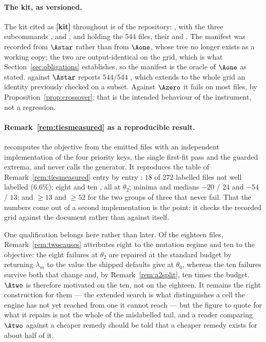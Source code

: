 \paragraph{The kit, as versioned.} The kit cited as \textbf{[kit]} throughout is
 of the repository: ,  with the
three subcommands ,  and , and  holding
the $544$ files, their  and . The manifest
was recorded from $\Astar$ rather than from $\Aone$, whose tree no longer exists as a working
copy; the two are output-identical on the grid, which is what
Section~\ref{sec:obligations} establishes, so the manifest is the oracle of $\Aone$ as stated.
 against $\Astar$ reports $544/544$ , which extends to the
whole grid an identity previously checked on a subset. Against $\Azero$ it fails on most
files, by Proposition~\ref{prop:crossover}; that is the intended behaviour of the instrument,
not a regression.

\paragraph{Remark~\ref{rem:tiesmeasured} as a reproducible result.} 
recomputes the objective from the emitted files with an independent implementation of the four
priority keys, the single first-fit pass and the guarded extrema, and never calls the
generator. It reproduces the table of Remark~\ref{rem:tiesmeasured} entry by entry :
$18$ of $272$ labelled files not well labelled ($6.6\%$); eight  and ten
, all at $\theta_2$; minima and medians $-20$ / $24$ and
$-54$ / $13$; and $\ge13$ and $\ge52$ for the two groups of three that never fail. That the
numbers come out of a second implementation is the point: it checks the recorded grid against
the document rather than against itself.

One qualification belongs here rather than later. Of the eighteen files,
Remark~\ref{rem:twocauses} attributes eight to the mutation regime and ten to the objective:
the eight  failures at $\theta_2$ are repaired at the standard budget by
returning $\lambda_m$ to the value the shipped defaults give at $\theta_0$, whereas the ten
 failures survive both that change and, by
Remark~\ref{rem:a2split}, ten times the budget. $\Atwo$ is therefore motivated on the ten, not
on the eighteen. It remains the right construction for them --- the extended search is what
distinguishes a cell the engine has not yet reached from one it cannot reach --- but the
figure to quote for what it repairs is not the whole of the mislabelled tail, and a reader
comparing $\Atwo$ against a cheaper remedy should be told that a cheaper remedy exists for
about half of it.

